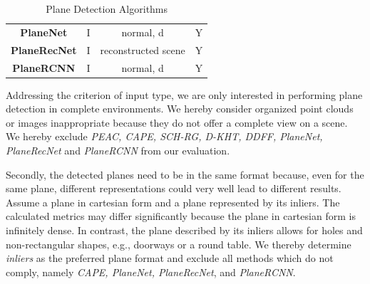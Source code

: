 \documentclass[main.tex]{subfiles}
\begin{document}
\begin{table}[H]
\begin{tabular}{c|c|c|c}
        \textbf{PlaneNet} \cite{Liu_Yang_Ceylan_Yumer_Furukawa_2018}     & I                   & normal, d             & Y                       \\ %
        \textbf{PlaneRecNet} \cite{Xie_Shu_Rambach_Pagani_Stricker_2022} & I                   & reconstructed scene   & Y                       \\ %
        \textbf{PlaneRCNN} \cite{Liu_Kim_Gu_Furukawa_Kautz_2019}         & I                   & normal, d             & Y                       \\ %
    \end{tabular}
    \caption{Plane Detection Algorithms}
    \label{tab:algos}
\end{table}

Addressing the criterion of input type, we are only interested in performing plane detection in complete environments. We hereby consider organized point clouds or images inappropriate because they do not offer a complete view
on a scene.\\
We hereby exclude  \textit{PEAC, CAPE, SCH-RG, D-KHT, DDFF, PlaneNet, PlaneRecNet} and \textit{PlaneRCNN} from our evaluation.


Secondly, the detected planes need to be in the same format because, even for the same plane, different representations could very well lead to different results.
Assume a plane in cartesian form and a plane represented by its inliers. The calculated metrics may differ significantly because the plane in cartesian form is infinitely dense.
In contrast, the plane described by its inliers allows for holes and non-rectangular shapes, e.g., doorways or a round table.
We thereby determine \textit{inliers} as the preferred plane format and exclude all methods which do not comply, namely \textit{CAPE, PlaneNet, PlaneRecNet}, and \textit{PlaneRCNN}.
\end{document}
